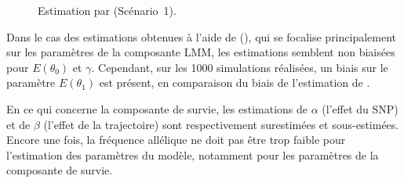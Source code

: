\documentclass[11pt, a4paper]{article}
\begin{document}
\begin{figure}[ht]
    \begin{center}
    \end{center}
    \vspace{-15pt}
    \caption{Estimation par  (Scénario~1).}
    \label{fig:S1joineR}
\end{figure}
\par{Dans le cas des estimations obtenues à l’aide de  (),
qui se focalise principalement sur les paramètres de la composante LMM, les estimations semblent non biaisées
pour $E(\theta_0)$ et $\gamma$. Cependant, sur les 1000 simulations réalisées, un biais sur le paramètre $E(\theta_1)$
est présent, en comparaison du biais de l'estimation de .}
\par{En ce qui concerne la composante de survie, les estimations de $\alpha$ (l’effet du SNP) et de $\beta$
(l’effet de la trajectoire) sont respectivement surestimées et sous-estimées. Encore une fois, la fréquence allélique
ne doit pas être trop faible pour l'estimation des paramètres du modèle, notamment pour les paramètres de la composante
de survie.}
\end{document}
